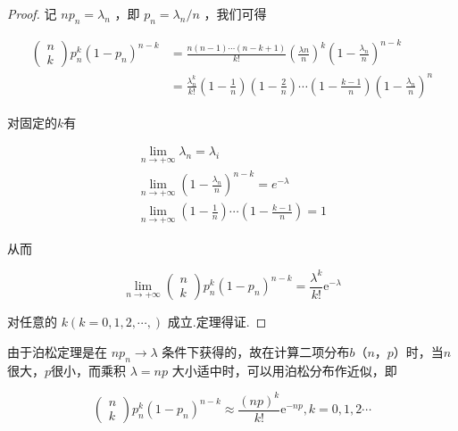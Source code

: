 \begin{proof}
	记 $n p_{n}=\lambda_{n}$ ，即 $p_{n}=\lambda_{n} / n$ ，我们可得
	
	\[
	\begin{array}{ll}
	{\left( 
		\begin{array}{l}
		{n} \\ 
		{k}
		\end{array}
		\right) p_{n}^{k}\left(1-p_{n}\right)^{n-k}} & {=\frac{n(n-1) \cdots(n-k+1)}{k !}
		\left(\frac{\lambda n}{n}\right)^{k}
		\left(1-\frac{\lambda_{n}}{n}\right)^{n-k}} \\
	{} & {=\frac{\lambda_{n}^{k}}{k !}
		\left(1-\frac{1}{n}\right)
		\left(1-\frac{2}{n}\right)
		\cdots
		\left(1-\frac{k-1}{n}\right)
		\left(1-\frac{\lambda_{n}}{n}\right)^{n}}
	\end{array}
	\]
	
	对固定的$ k $有
	
	\[
	\begin{array}{l}{\lim _{n \rightarrow+\infty} \lambda_{n}=\lambda_{i}} \\ {\lim _{n \rightarrow+\infty}\left(1-\frac{\lambda_{n}}{n}\right)^{n-k}=e^{-\lambda}} \\ {\lim _{n \rightarrow+\infty}\left(1-\frac{1}{n}\right) \cdots\left(1-\frac{k-1}{n}\right)=1}\end{array}
	\]
	
	从而
	
	\[
	\lim _{n \rightarrow+\infty} \left( \begin{array}{l}{n} \\ {k}\end{array}\right) p_{n}^{k}\left(1-p_{n}\right)^{n-k}=\frac{\lambda^{k}}{k !} \mathrm{e}^{-\lambda}
	\]
	
	对任意的 $k(k=0,1,2, \cdots,)$ 成立.定理得证.
	
\end{proof}

由于泊松定理是在 $n p_{n} \rightarrow \lambda$ 条件下获得的，故在计算二项分布$ b（n，p） $时，当$ n $很大，$ p $很小，而乘积 $\lambda=n p$ 大小适中时，可以用泊松分布作近似，即

\begin{equation}
\left( \begin{array}{l}{n} \\ {k}\end{array}\right) p_{n}^{k}\left(1-p_{n}\right)^{n-k} \approx \frac{(n p)^{k}}{k !} \mathrm{e}^{-n p}, k=0,1,2 \cdots \label{eq:2.4.5}
\end{equation}

